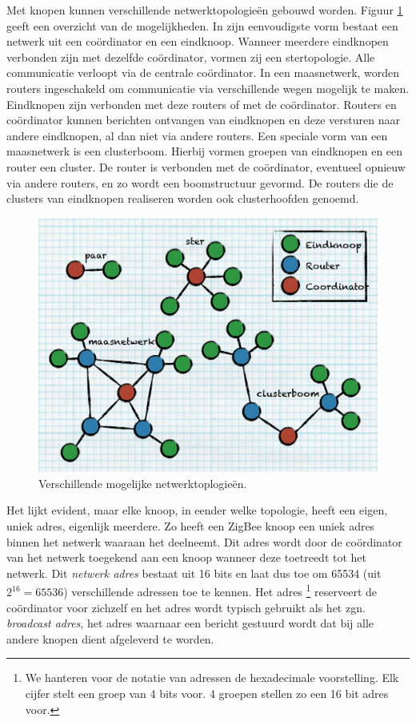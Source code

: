 Met knopen kunnen verschillende netwerktopologie\"en gebouwd worden. Figuur
\ref{fig:topologie} geeft een overzicht van de mogelijkheden. In zijn
eenvoudigste vorm bestaat een netwerk uit een co\"ordinator en een eindknoop.
Wanneer meerdere eindknopen verbonden zijn met dezelfde co\"ordinator, vormen
zij een stertopologie. Alle communicatie verloopt via de centrale
co\"ordinator. In een maasnetwerk, worden routers ingeschakeld om communicatie
via verschillende wegen mogelijk te maken. Eindknopen zijn verbonden met deze
routers of met de co\"ordinator. Routers en co\"ordinator kunnen berichten
ontvangen van eindknopen en deze versturen naar andere eindknopen, al dan niet
via andere routers. Een speciale vorm van een maasnetwerk is een clusterboom.
Hierbij vormen groepen van eindknopen en een router een cluster. De router is
verbonden met de co\"ordinator, eventueel opnieuw via andere routers, en zo
wordt een boomstructuur gevormd. De routers die de clusters van eindknopen
realiseren worden ook clusterhoofden genoemd.

\begin{figure}[ht]
  \centering
  \includegraphics[width=0.7\linewidth]{resources/topology.pdf}
  \caption{Verschillende mogelijke netwerktoplogie\"en.}
  \label{fig:topologie}
\end{figure}

Het lijkt evident, maar elke knoop, in eender welke topologie, heeft een eigen,
uniek adres, eigenlijk meerdere. Zo heeft een ZigBee knoop een uniek adres
binnen het netwerk waaraan het deelneemt. Dit adres wordt door de co\"ordinator
van het netwerk toegekend aan een knoop wanneer deze toetreedt tot het netwerk.
Dit \emph{netwerk adres} bestaat uit 16 bits en laat dus toe om 65534 (uit
$2^{16} = 65536$) verschillende adressen toe te kennen. Het adres
\footnote{We hanteren voor de notatie van adressen de hexadecimale
voorstelling. Elk cijfer stelt een groep van 4 bits voor. 4 groepen stellen zo
een 16 bit adres voor.} reserveert de co\"ordinator voor zichzelf en het adres
 wordt typisch gebruikt als het zgn. \emph{broadcast adres}, het
adres waarnaar een bericht gestuurd wordt dat bij alle andere knopen dient
afgeleverd te worden.

